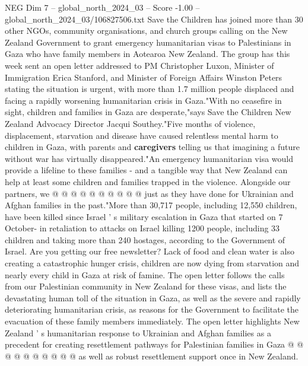 \begin{textsample}{NEG Dim 7 – global\_north\_2024\_03 – Score -1.00 – global\_north\_2024\_03/106827506.txt}  \label{ex:f7_neg_417}
Save the Children has joined more than 30 other NGOs, community organisations, and church groups calling on the New Zealand Government to grant emergency humanitarian visas to Palestinians in Gaza who have family members in Aotearoa New Zealand.
The group has this week sent an open letter addressed to PM Christopher Luxon, Minister of Immigration Erica Stanford, and Minister of Foreign Affairs Winston Peters stating the situation is urgent, with more than 1.7 million people displaced and facing a rapidly worsening humanitarian crisis in Gaza."With no ceasefire in sight, children and families in Gaza are desperate,"says Save the Children New Zealand Advocacy Director Jacqui Southey."Five months of violence, displacement, starvation and disease have caused relentless mental harm to children in Gaza, with parents and \textbf{caregivers} telling us that imagining a future without war has virtually disappeared."An emergency humanitarian visa would provide a lifeline to these families - and a tangible way that New Zealand can help at least some children and families trapped in the violence.
Alongside our partners, we @ @ @ @ @ @ @ @ @ @ just as they have done for Ukrainian and Afghan families in the past."More than 30,717 people, including 12,550 children, have been killed since Israel ' s military escalation in Gaza that started on 7 October- in retaliation to attacks on Israel killing 1200 people, including 33 children and taking more than 240 hostages, according to the Government of Israel.
Are you getting our free newsletter?
Lack of food and clean water is also creating a catastrophic hunger crisis, children are now dying from starvation and nearly every child in Gaza at risk of famine.
The open letter follows the calls from our Palestinian community in New Zealand for these visas, and lists the devastating human toll of the situation in Gaza, as well as the severe and rapidly deteriorating humanitarian crisis, as reasons for the Government to facilitate the evacuation of these family members immediately.
The open letter highlights New Zealand ' s humanitarian response to Ukrainian and Afghan families as a precedent for creating resettlement pathways for Palestinian families in Gaza @ @ @ @ @ @ @ @ @ @ as well as robust resettlement support once in New Zealand.

\end{textsample}

